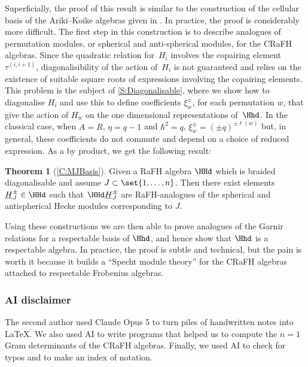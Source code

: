 \documentclass[a4paper,11pt]{amsart}
\numberwithin{equation}{subsection}
\theoremstyle{definition}
\theoremstyle{theorem}
\newcounter{maintheorem}
\newtheorem{MainTheorem}[maintheorem]{Theorem}
\theoremstyle{remark}
\newcommand\HJ{\underline{H}}
\begin{document}
Superficially, the proof of this result is similar to the construction
of the cellular basis of the Ariki--Koike algebras given in
\cite[Theorem~3.26]{DJM:cyc}. In practice, the proof is considerably
more difficult. The first step in this construction is to describe
analogues of permutation modules, or spherical and anti-spherical
modules, for the CRaFH algebras. Since the quadratic relation for~$H_i$
involves the copairing element $\tau^{(i,i+1)}$, diagonalisibility of
the action of~$H_i$ is not guaranteed and relies on the existence of
suitable square roots of expressions involving the copairing elements.
This problem is the subject of \autoref{S:Diagonalisable}, where we show
how to diagonalise $H_i$ and use this to define coefficients
$\xi^\pm_w$, for each permutation $w$, that give the action of $H_w$ on
the one dimensional representations of~$\Hhd$. In the classical case,
when $A=R$, $\eta=q-1$ and $\hbar^2=q$, $\xi^\pm_w=(\pm q)^{\pm\ell(w)}$
but, in general, these coefficients do not commute and depend on a
choice of reduced expression.  As a by product, we get the following
result:

\begin{MainTheorem}[\autoref{C:MJBasis}]
Given a RaFH algebra $\HHd$ which is braided diagonalisable and assume $J\subset\set{1,\ldots,n}$. Then there exist elements $\HJ^\pm_J\in\HHd$ such that  $\HHd\HJ^\pm_J$ are  RaFH-analogues of the spherical and antispherical Hecke modules corresponding to $J$.
\end{MainTheorem}

Using these constructions we are then able to prove
analogues of the Garnir relations for a respectable basis of $\Hhd$, and
hence show that $\Hhd$ is a respectable algebra. In practice, the proof
is subtle and technical, but the pain is worth it because it builds a
``Specht module theory'' for the CRaFH algebras attached to respectable
Frobenius algebras.

\subsubsection*{AI disclaimer} The second author used Claude Opus 5 to
turn piles of handwritten notes into \LaTeX. We also used AI to write
programs that helped us to compute the $n=1$ Gram determinants of the
CRaFH algebras.  Finally, we used AI to check for typos and to make an
index of notation.
\end{document}
